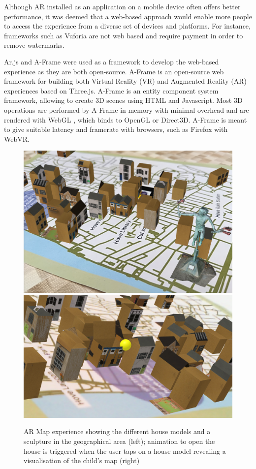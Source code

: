 \documentclass[acmlarge,screen,dvipsnames]{acmart}
\begin{document}
Although AR installed as an application on a mobile device often offers better
performance, it was deemed that a web-based approach would enable more people
to access the experience from a diverse set of devices and platforms. For
instance, frameworks such as Vuforia \cite{Vuforia} are not web based and
require payment in order to remove watermarks. 

Ar.js and A-Frame were used as a framework to develop the web-based experience
as they are both open-source. A-Frame is an open-source web framework for
building both Virtual Reality (VR) and Augmented Reality (AR) experiences
based on Three.js. A-Frame is an entity component system framework, allowing to create 3D scenes using HTML and Javascript. Most 3D operations are
performed by A-Frame in memory with minimal overhead and are rendered with
WebGL \cite{webgl}, which binds to OpenGL or Direct3D. A-Frame is meant to
give suitable latency and framerate with browsers, such as Firefox with WebVR.


\begin{figure}[ht] \centering
\includegraphics[width=0.48\linewidth]{images/ARcontentw_sculpture.png}
\includegraphics[width=0.48\linewidth]{images/animationARexperience_zoom.png}
\caption{AR Map experience showing the different house models and a sculpture in the geographical area (left); animation to open the house is triggered when the user taps on a house model revealing a visualisation
 of the child's map (right)} \label{fig:ARexperience}
\end{figure}
 
\end{document}
